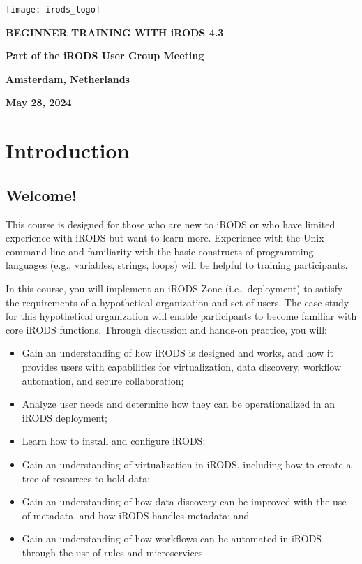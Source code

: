 \documentclass[10pt,oneside]{memoir}
\begin{document}
\thispagestyle{empty}

\centerline{\texttt{[image: irods\_logo]}}

\begin{center}

\vspace{20mm}
\huge{\textbf{BEGINNER TRAINING WITH iRODS 4.3}}

\vspace{60mm}
\textbf{Part of the iRODS User Group Meeting}

\vspace{10mm}
\textbf{Amsterdam, Netherlands}

\vspace{10mm}
\textbf{May 28, 2024}

\end{center}

\newpage

\frontmatter

\tableofcontents*
\newpage

\chapter{Introduction}

\section{Welcome!}

This course is designed for those who are new to iRODS or who have limited experience with iRODS but want to learn more. Experience with the Unix command line and familiarity with the basic constructs of programming languages (e.g., variables, strings, loops) will be helpful to training participants.

In this course, you will implement an iRODS Zone (i.e., deployment) to satisfy the requirements of a hypothetical organization and set of users. The case study for this hypothetical organization will enable participants to become familiar with core iRODS functions. Through discussion and hands-on practice, you will:

\begin{itemize}
  \item Gain an understanding of how iRODS is designed and works, and how it provides users with capabilities for virtualization, data discovery, workflow automation, and secure collaboration;
  \item Analyze user needs and determine how they can be operationalized in an iRODS deployment;
  \item Learn how to install and configure iRODS;
  \item Gain an understanding of virtualization in iRODS, including how to create a tree of resources to hold data;
  \item Gain an understanding of how data discovery can be improved with the use of metadata, and how iRODS handles metadata; and
  \item Gain an understanding of how workflows can be automated in iRODS through the use of rules and microservices.
\end{itemize}
\end{document}
